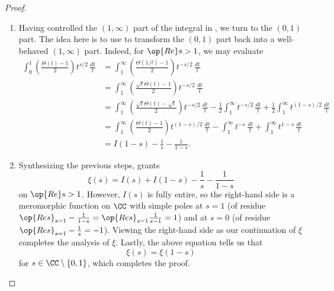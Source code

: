 \documentclass[../notes.tex]{subfiles}
\begin{document}
\begin{proof}
\begin{enumerate}
		\item Having controlled the $(1,\infty)$ part of the integral in , we turn to the $(0,1)$ part. The idea here is to use  to transform the $(0,1)$ part back into a well-behaved $(1,\infty)$ part. Indeed, for $\op{Re}s>1$, we may evaluate
		\begin{align*}
			\int_0^1\left(\frac{\Theta(t)-1}2\right)t^{s/2}\,\frac{dt}t &= \int_1^\infty\left(\frac{\Theta(1/t)-1}2\right)t^{-s/2}\,\frac{dt}t \\
			&= \int_1^\infty\left(\frac{\sqrt t\Theta(t)-1}2\right)t^{-s/2}\,\frac{dt}t \\
			&= \int_1^\infty\left(\frac{\sqrt t\Theta(t)-\sqrt t}2\right)t^{-s/2}\,\frac{dt}t-\frac12\int_1^\infty t^{-s/2}\,\frac{dt}t+\frac12\int_1^\infty t^{(1-s)/2}\,\frac{dt}t \\
			&= \int_1^\infty\left(\frac{\Theta(t)-1}2\right)t^{(1-s)/2}\,\frac{dt}t-\int_1^\infty t^{-s}\,\frac{dt}t+\int_1^\infty t^{1-s}\,\frac{dt}t \\
			&= I(1-s)-\frac1s-\frac1{1-s}.
		\end{align*}

		\item Synthesizing the previous steps,  grants
		\[\xi(s)=I(s)+I(1-s)-\frac1s-\frac1{1-s}\]
		on $\op{Re}s>1$. However, $I(s)$ is fully entire, so the right-hand side is a meromorphic function on $\CC$ with simple poles at $s=1$ (of residue $\op{Res}_{s=1}-\frac1{1-s}=\op{Res}_{s=1}\frac1{s-1}=1$) and at $s=0$ (of residue $\op{Res}_{s=1}-\frac1s=-1$). Viewing the right-hand side as our continuation of $\xi$ completes the analysis of $\xi$. Lastly, the above equation tells us that
		\[\xi(s)=\xi(1-s)\]
		for $s\in\CC\setminus\{0,1\}$, which completes the proof.
		\qedhere
	\end{enumerate}
\end{proof}
\end{document}
